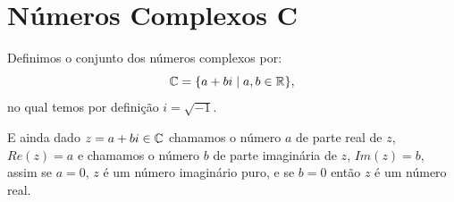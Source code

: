  \chapter{Números Complexos C}%

 \vskip0.3cm
 \colorbox{azul}{
 \begin{minipage}{0.9\linewidth}
 \begin{center}
  Definimos o conjunto dos números complexos por:
 \[\mathbb{C}= \{a + bi \mid a, b \in \mathbb{R} \} ,\]
 no qual temos por definição $i= \sqrt{-1}$.
 \end{center}
 \end{minipage}}
 \vskip0.3cm

 E ainda dado $z= a+bi \in \mathbb{C}$ chamamos o número $a$ de parte real de $z$, $Re(z)= a$ e chamamos o número $b$ de parte imaginária de $z$, $Im(z)= b$, assim se $a=0$, $z$ é um número imaginário puro, e se $b=0$ então $z$ é um número real.

